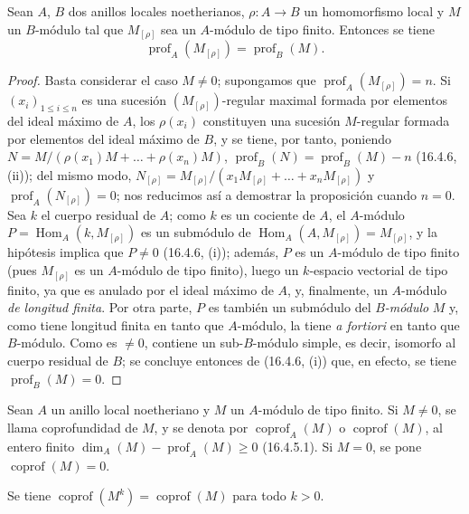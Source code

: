 \begin{proposition}[16.4.8]
\label{0.16.4.8-es}
Sean $A$, $B$ dos anillos locales noetherianos,
$\rho:A\to B$ un homomorfismo local y $M$ un $B$-módulo tal que
$M_{[\rho]}$ sea un $A$-módulo de tipo finito. Entonces se tiene
\begin{equation}
\label{0.16.4.8.1-es}
\tag{16.4.8.1}
  \operatorname{prof}_A(M_{[\rho]})=\operatorname{prof}_B(M).
\end{equation}
\end{proposition}

\begin{proof}
Basta considerar el caso $M\neq0$; supongamos que
$\operatorname{prof}_A(M_{[\rho]})=n$. Si $(x_i)_{1\leq i\leq n}$ es una
sucesión $(M_{[\rho]})$-regular maximal formada por elementos del ideal máximo
de $A$, los $\rho(x_i)$ constituyen una sucesión $M$-regular formada por
elementos del ideal máximo de $B$, y se tiene, por tanto, poniendo
$N=M/(\rho(x_1)M+\ldots+\rho(x_n)M)$,
$\operatorname{prof}_B(N)=\operatorname{prof}_B(M)-n$ (16.4.6, (ii)); del
mismo modo,
$N_{[\rho]}=M_{[\rho]}/(x_1M_{[\rho]}+\ldots+x_nM_{[\rho]})$ y
$\operatorname{prof}_A(N_{[\rho]})=0$; nos reducimos así a demostrar la
proposición cuando $n=0$. Sea $k$ el cuerpo residual de $A$; como $k$ es un
cociente de $A$, el $A$-módulo
$P=\operatorname{Hom}_A(k,M_{[\rho]})$ es un submódulo de
$\operatorname{Hom}_A(A,M_{[\rho]})=M_{[\rho]}$, y la hipótesis implica que
$P\neq0$ (16.4.6, (i)); además, $P$ es un $A$-módulo de tipo finito
(pues $M_{[\rho]}$ es un $A$-módulo de tipo finito), luego un $k$-espacio
vectorial de tipo finito, ya que es anulado por el ideal máximo de $A$, y,
finalmente, un $A$-módulo \emph{de longitud finita}. Por otra parte, $P$ es también un
submódulo del \emph{$B$-módulo} $M$ y, como tiene longitud finita en tanto que
$A$-módulo, la tiene \emph{a fortiori} en tanto que $B$-módulo. Como es
$\neq0$, contiene un sub-$B$-módulo simple, es decir, isomorfo al cuerpo
residual de $B$; se concluye entonces de (16.4.6, (i)) que, en efecto, se tiene
$\operatorname{prof}_B(M)=0$.
\end{proof}

\begin{definition}[16.4.9]
\label{0.16.4.9-es}
Sean $A$ un anillo local noetheriano y $M$ un $A$-módulo de tipo finito. Si
$M\neq0$, se llama coprofundidad de $M$, y se denota por
$\operatorname{coprof}_A(M)$ o $\operatorname{coprof}(M)$, al entero finito
$\dim_A(M)-\operatorname{prof}_A(M)\geq0$ (16.4.5.1). Si $M=0$, se pone
$\operatorname{coprof}(M)=0$.

Se tiene $\operatorname{coprof}(M^k)=\operatorname{coprof}(M)$ para todo
$k>0$.
\end{definition}


